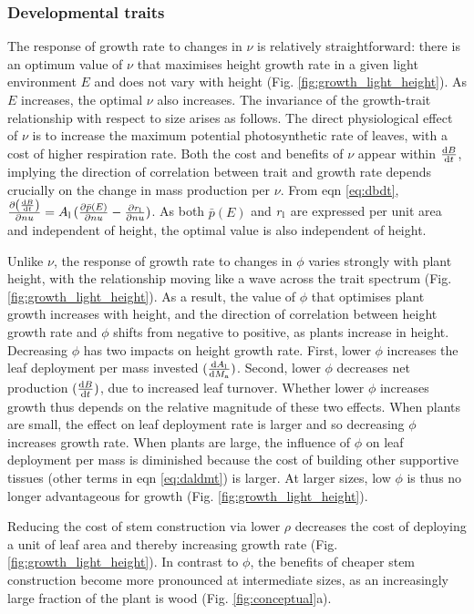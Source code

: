 \documentclass[9pt,twocolumn,twoside,lineno]{pnas-new}
\begin{document}
\subsubsection{Developmental traits}  The response of growth rate to changes in $\nu$ is relatively straightforward: there is an optimum value of $\nu$ that maximises height growth rate in a given light environment $E$ and does not vary with height (Fig. \ref{fig:growth_light_height}). As $E$ increases, the optimal $\nu$ also increases. The invariance of the growth-trait relationship with respect to size arises as follows. The direct physiological effect of $\nu$ is to increase the maximum potential photosynthetic rate of leaves, with a cost of higher respiration rate. Both the cost and benefits of $\nu$ appear within $\frac{ {\rm d}B} {{\rm d}t}$, implying the direction of correlation between trait and growth rate depends crucially on the change in mass production per $\nu$.
From eqn \ref{eq:dbdt}, $\frac{\partial \left( \frac{ {\rm d}B} {{\rm d}t}\right)}{\partial nu} = A_{\rm l} \, (\frac{ \partial \bar{p}(E)}{\partial nu}  - \frac{ \partial r_{\rm l}}{\partial nu} )$. As both $\bar{p}(E)$ and $r_{\rm l}$ are expressed per unit area and independent of height, the optimal value is also independent of height.

Unlike $\nu$, the response of growth rate to changes in $\phi$ varies strongly with plant height, with the relationship moving like a wave across the trait spectrum (Fig. \ref{fig:growth_light_height}). As a result, the value of $\phi$ that optimises plant growth increases with height, and the direction of correlation between height growth rate and $\phi$ shifts from negative to positive, as plants increase in height. Decreasing $\phi$ has two impacts on height growth rate. First, lower $\phi$ increases the leaf deployment per mass invested $(\frac{{\rm d}A_{\rm l}}{{\rm d}M_{\rm a}})$. Second, lower $\phi$ decreases net production $(\frac{{\rm d}B}{{\rm d}t})$, due to increased leaf turnover. Whether lower $\phi$ increases growth thus depends on the relative magnitude of these two effects. When plants are small, the effect on leaf deployment rate is larger and so decreasing $\phi$ increases growth rate. When plants are large, the influence of $\phi$ on leaf deployment per mass is diminished because the cost of building other supportive tissues (other terms in eqn \ref{eq:daldmt}) is larger. At larger sizes, low $\phi$ is thus no longer advantageous for growth (Fig. \ref{fig:growth_light_height}).

Reducing the cost of stem construction via lower $\rho$ decreases the cost of deploying a unit of leaf area and thereby increasing growth rate (Fig. \ref{fig:growth_light_height}). In contrast to $\phi$, the benefits of cheaper stem construction become more pronounced at intermediate sizes, as an increasingly large fraction of the plant is wood (Fig. \ref{fig:conceptual}a).
\end{document}
